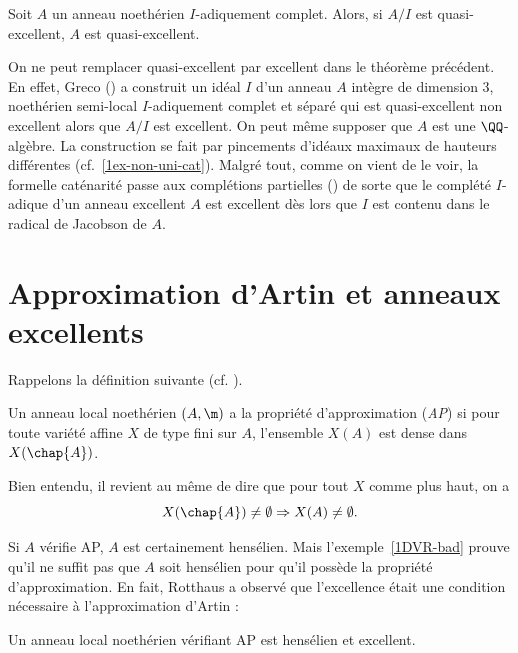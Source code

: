 \documentclass[10pt]{../fichiers-configuration-latex/smfart}
\begin{document}
\begin{theoreme}[Gabber]Soit $A$ un anneau noethérien $I$-adiquement complet.  Alors, si $A/I$ est
quasi-excellent, $A$ est quasi-excellent.\end{theoreme}

On ne peut remplacer quasi-excellent par excellent dans le théorème précédent. En effet, Greco
(\cite{Gre82}) a construit un idéal $I$ d'un anneau $A$ intègre de dimension $3$, noethérien
semi-local $I$-adiquement complet et séparé qui est quasi-excellent non excellent alors que $A/I$
est excellent. On peut même supposer que $A$ est une $\QQ$-algèbre. La construction se fait par
pincements d'idéaux maximaux de hauteurs différentes (cf.~\ref{1ex-non-uni-cat}). Malgré tout, comme
on vient de le voir, la formelle caténarité passe aux complétions partielles (\cite{Sey70}) de sorte
que le complété $I$-adique d'un anneau excellent $A$ est excellent dès lors que $I$ est contenu dans
le radical de Jacobson de $A$.

\section{Approximation d'Artin et anneaux excellents}

Rappelons la définition suivante (cf. \cite{Art69}).

\begin{definition}[M. Artin] Un anneau local noethérien $(A,\m)$ a la propriété d'approximation
(\emph{AP})  si pour toute variété affine $X$ de type fini sur $A$, l'ensemble $X(A)$ est dense dans
$X(\chap{A})$.  \end{definition}

Bien entendu, il revient au même de dire que pour tout $X$ comme plus haut, on a
$$X(\chap{A})\not=\emptyset\Rightarrow X(A)\not=\emptyset.$$

Si $A$ vérifie AP, $A$ est certainement hensélien. Mais l'exemple~\ref{1DVR-bad} prouve qu'il ne
suffit pas que $A$ soit hensélien pour qu'il possède la propriété d'approximation. En fait, Rotthaus
a observé que l'excellence était une condition nécessaire à l'approximation d'Artin :

\begin{lemme} Un anneau local noethérien vérifiant AP est hensélien et excellent.
\end{lemme}
\end{document}
